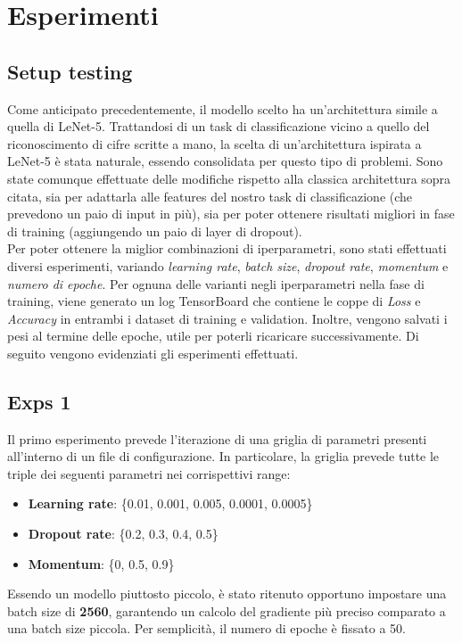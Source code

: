 \chapter{Esperimenti}
\section*{Setup testing}
Come anticipato precedentemente, il modello scelto ha un'architettura simile a quella di LeNet-5. Trattandosi di un task di classificazione vicino a quello del riconoscimento di cifre scritte a mano, la scelta di un'architettura ispirata a LeNet-5 è stata naturale, essendo consolidata per questo tipo di problemi.
Sono state comunque effettuate delle modifiche rispetto alla classica architettura sopra citata, sia per adattarla alle features del nostro task di classificazione (che prevedono un paio di input in più), sia per poter ottenere risultati migliori in fase di training (aggiungendo un paio di layer di dropout).
\\
Per poter ottenere la miglior combinazioni di iperparametri, sono stati effettuati diversi esperimenti, variando \emph{learning rate}, \emph{batch size}, \emph{dropout rate}, \emph{momentum} e \emph{numero di epoche}.
Per ognuna delle varianti negli iperparametri nella fase di training, viene generato un log TensorBoard che contiene le coppe di \emph{Loss} e \emph{Accuracy} in entrambi i dataset di training e validation. Inoltre, vengono salvati i pesi al termine delle epoche, utile per poterli ricaricare successivamente.
Di seguito vengono evidenziati gli esperimenti effettuati.

\section{Exps 1}
Il primo esperimento prevede l'iterazione di una griglia di parametri presenti all'interno di un file di configurazione. In particolare, la griglia prevede tutte le triple dei seguenti parametri nei corrispettivi range:
\begin{itemize}
    \item \textbf{Learning rate}: \{0.01, 0.001, 0.005, 0.0001, 0.0005\}
    \item \textbf{Dropout rate}: \{0.2, 0.3, 0.4, 0.5\}
    \item \textbf{Momentum}: \{0, 0.5, 0.9\}
\end{itemize}

Essendo un modello piuttosto piccolo, è stato ritenuto opportuno impostare una batch size di \textbf{2560}, garantendo un calcolo del gradiente più preciso comparato a una batch size piccola. Per semplicità, il numero di epoche è fissato a 50.

